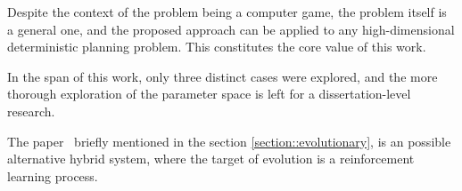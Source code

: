 \documentclass[12pt, a4paper]{article}
\begin{document}
	Despite the context of the problem being a computer game, the problem itself is a general one, and the proposed approach can be applied to any high-dimensional deterministic planning problem.
	This constitutes the core value of this work.

	In the span of this work, only three distinct cases were explored, and the more thorough exploration of the parameter space is left for a dissertation-level research.

	The paper~\cite{song2023rl_ea} briefly mentioned in the section \ref{section::evolutionary}, is an possible alternative hybrid system, where the target of evolution is a reinforcement learning process.




	\printbibliography
\end{document}
